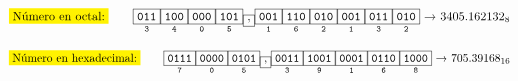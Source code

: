 \documentclass[a4paper,12pt]{article}
\begin{document}
\[
\mathtt{
	\colorbox{yellow}{Número en octal:} \qquad
	\underset{3}{\boxed{\mathtt{011}}}
	\underset{4}{\boxed{\mathtt{100}}}
	\underset{0}{\boxed{\mathtt{000}}}
	\underset{5}{\boxed{\mathtt{101}}}
	\underset{}{\boxed{\mathtt{,}}}
	\underset{1}{\boxed{\mathtt{001}}}
	\underset{6}{\boxed{\mathtt{110}}}
	\underset{2}{\boxed{\mathtt{010}}}
	\underset{1}{\boxed{\mathtt{001}}}
	\underset{3}{\boxed{\mathtt{011}}}
	\underset{2}{\boxed{\mathtt{010}}}
	\text{ → $3405.162132_8$}
}	
\] 

\[
\mathtt{
	\colorbox{yellow}{Número en hexadecimal:} \qquad
	\underset{7}{\boxed{\mathtt{0111}}}
	\underset{0}{\boxed{\mathtt{0000}}}
	\underset{5}{\boxed{\mathtt{0101}}}
	\underset{}{\boxed{\mathtt{,}}}
	\underset{3}{\boxed{\mathtt{0011}}}
	\underset{9}{\boxed{\mathtt{1001}}}
	\underset{1}{\boxed{\mathtt{0001}}}
	\underset{6}{\boxed{\mathtt{0110}}}
	\underset{8}{\boxed{\mathtt{1000}}}
	\text{ → $705.39168_{16}$}
}	
\]	
	
\end{document}
